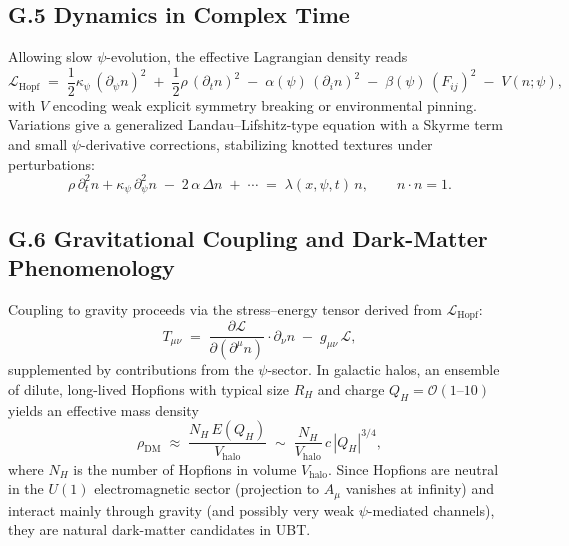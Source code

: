 \documentclass[12pt,a4paper]{article}
\numberwithin{equation}{section}
\theoremstyle{definition}
\theoremstyle{remark}
\begin{document}
\subsection*{G.5 Dynamics in Complex Time}
Allowing slow $\psi$-evolution, the effective Lagrangian density reads
\begin{equation}
\mathcal{L}_{\mathrm{Hopf}} \;=\; \frac{1}{2} \kappa_\psi \, (\partial_\psi n)^2 \;+\; \frac{1}{2}\rho \, (\partial_t n)^2 \;-\; \alpha(\psi)\, (\partial_i n)^2 \;-\; \beta(\psi)\, (F_{ij})^2 \;-\; V(n;\psi),
\end{equation}
with $V$ encoding weak explicit symmetry breaking or environmental pinning. 
Variations give a generalized Landau--Lifshitz-type equation with a Skyrme term and small $\psi$-derivative corrections, stabilizing knotted textures under perturbations:
\begin{equation}
\rho\, \partial_t^2 n + \kappa_\psi\, \partial_\psi^2 n \;-\; 2\,\alpha \,\Delta n \;+\; \cdots \;=\; \lambda(x,\psi,t)\, n,\qquad n\cdot n=1.
\end{equation}

\subsection*{G.6 Gravitational Coupling and Dark-Matter Phenomenology}
Coupling to gravity proceeds via the stress--energy tensor derived from $\mathcal{L}_{\mathrm{Hopf}}$:
\begin{equation}
T_{\mu\nu} \;=\; \frac{\partial \mathcal{L}}{\partial(\partial^\mu n)}\cdot \partial_\nu n \;-\; g_{\mu\nu}\,\mathcal{L},
\end{equation}
supplemented by contributions from the $\psi$-sector. 
In galactic halos, an ensemble of dilute, long-lived Hopfions with typical size $R_H$ and charge $Q_H=\mathcal{O}(1\text{--}10)$ yields an effective mass density
\begin{equation}
\rho_{\mathrm{DM}} \;\approx\; \frac{N_H\, E(Q_H)}{V_{\mathrm{halo}}} \;\sim\; \frac{N_H}{V_{\mathrm{halo}}}\, c\, |Q_H|^{3/4},
\end{equation}
where $N_H$ is the number of Hopfions in volume $V_{\mathrm{halo}}$. 
Since Hopfions are neutral in the $U(1)$ electromagnetic sector (projection to $A_\mu$ vanishes at infinity) and interact mainly through gravity (and possibly very weak $\psi$-mediated channels), they are natural dark-matter candidates in UBT.
\end{document}
